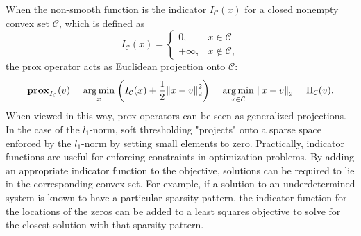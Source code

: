 When the non-smooth function is the indicator $I_{\mathcal{C}}(x)$ for a closed nonempty convex set $\mathcal{C}$, which is defined as
\begin{equation}
 I_{\mathcal{C}}(x) = \begin{cases}
                       0, & x \in \mathcal{C}\\
                       +\infty, & x \notin \mathcal{C},
                      \end{cases}
\end{equation}
the prox operator acts as Euclidean projection onto $\mathcal{C}$:
\begin{equation}
 \prox_{I_{\mathcal{C}}} (v) = \argmin_{x} \; \paren*{I_{\mathcal{C}}(x) + \frac{1}{2} \norm{2}{x - v}^2} = \argmin_{x \in \mathcal{C}} \; \norm{2}{x - v} = \Pi_{\mathcal{C}}(v).
\end{equation}
When viewed in this way, prox operators can be seen as generalized projections. In the case of the $l_1$-norm, soft thresholding "projects" onto a sparse space enforced by the $l_1$-norm by setting small elements to zero. Practically, indicator functions are useful for enforcing constraints in optimization problems. By adding an appropriate indicator function to the objective, solutions can be required to lie in the corresponding convex set. For example, if a solution to an underdetermined system is known to have a particular sparsity pattern, the indicator function for the locations of the zeros can be added to a least squares objective to solve for the closest solution with that sparsity pattern.

